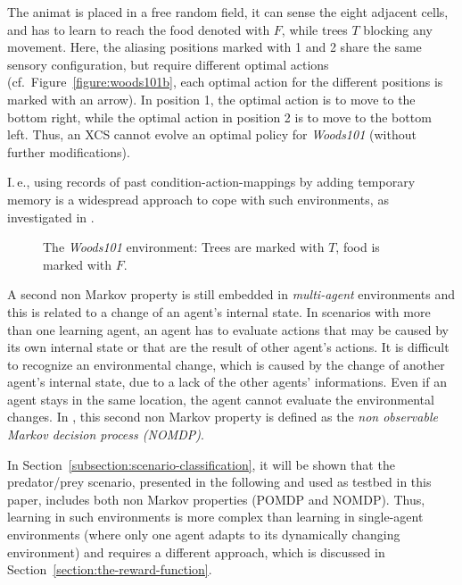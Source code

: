 The animat is placed in a free random field, it can sense the eight adjacent cells, and has to learn to reach the food denoted with $F$, while trees $T$ blocking any movement. Here, the aliasing positions marked with 1 and 2 share the same sensory configuration, but require different optimal actions (cf.\ Figure~\ref{figure:woods101b}, each optimal action for the different positions is marked with an arrow). In position 1, the optimal action is to move to the bottom right, while the optimal action in position 2 is to move to the bottom left. Thus, an XCS cannot evolve an optimal policy for \emph{Woods101} (without further modifications).

I.\,e., using records of past condition-action-mappings by adding temporary memory is a widespread approach to cope with such environments, as investigated in \cite{Lan98,LW00}.

\begin{figure}[ht]
  \hfill
  \hfill
  \caption{The \emph{Woods101} environment: Trees are marked with $T$, food is marked with $F$.}
  \label{figure:woods101}
\end{figure}

A second non Markov property is still embedded in \emph{multi-agent} environments and this is related to a change of an agent's internal state. In scenarios with more than one learning agent, an agent has to evaluate actions that may be caused by its own internal state or that are the result of other agent's actions. It is difficult to recognize an environmental change, which is caused by the change of another agent's internal state, due to a lack of the other agents' informations. Even if an agent stays in the same location, the agent cannot evaluate the environmental changes. In \cite{TTS01}, this second non Markov property is defined as the \emph{non observable Markov decision process (NOMDP)}. 

In Section~\ref{subsection:scenario-classification}, it will be shown that the predator/prey scenario, presented in the following and used as testbed in this paper, includes both non Markov properties (POMDP and NOMDP). Thus, learning in such environments is more complex than learning in single-agent environments (where only one agent adapts to its dynamically changing environment) and requires a different approach, which is discussed in Section~\ref{section:the-reward-function}.

